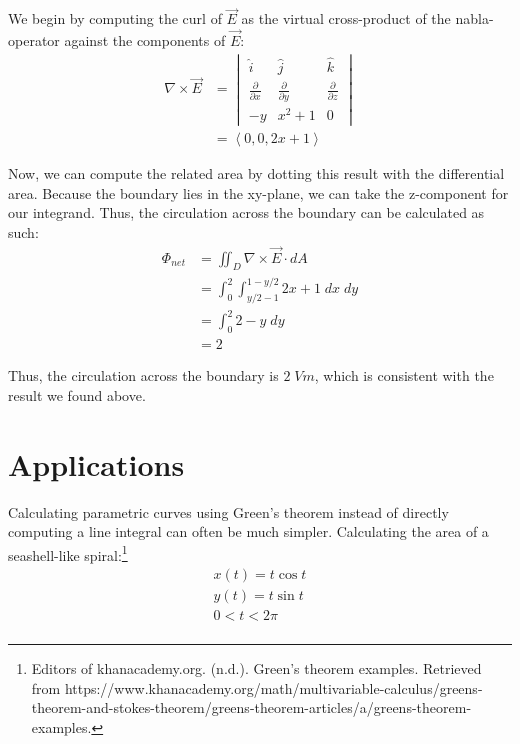 \documentclass[11pt,English]{article}
\begin{document}
We begin by computing the curl of $\vec{E}$ as the virtual cross-product of the nabla-operator against the components of $\vec{E}$:
\begin{align*}
    \nabla \times \vec{E} &=
    \begin{vmatrix}
        \hat{i} & \hat{j} & \hat{k} \\
        \frac{\partial}{\partial x} & \frac{\partial}{\partial y} & \frac{\partial}{\partial z} \\
        -y & x^2 + 1 & 0
    \end{vmatrix} \\
    &= \left<0,0,2x+1\right>
\end{align*}

Now, we can compute the related area by dotting this result with the differential area. Because the boundary lies in the xy-plane, we can take the z-component for our integrand. Thus, the circulation across the boundary can be calculated as such:
\begin{align*}
    \Phi_{net} &= \iint_D \nabla \times \vec{E} \cdot dA \\
    &= \int_0^2 \int_{y/2-1}^{1-y/2} 2x+1 \; dx \; dy \\
    &= \int_0^2 2-y \; dy \\
    &= 2
\end{align*}

Thus, the circulation across the boundary is $2 \; Vm$, which is consistent with the result we found above.

\section{Applications}
Calculating parametric curves using Green's theorem instead of directly computing a line integral can often be much simpler. Calculating the area of a seashell-like spiral:\footnote{Editors of khanacademy.org. (n.d.). Green's theorem examples. Retrieved from https://www.khanacademy.org/math/multivariable-calculus/greens-theorem-and-stokes-theorem/greens-theorem-articles/a/greens-theorem-examples.}
\begin{align*}
    x(t) = t\cos{t} \\
    y(t) = t\sin{t}  \\
    0<t<2\pi \\
\end{align*}
\end{document}
